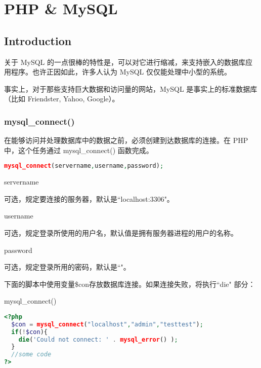 \part{PHP \& MySQL}



\chapter{Introduction}








关于 MySQL 的一点很棒的特性是，可以对它进行缩减，来支持嵌入的数据库应用程序。也许正因如此，许多人认为 MySQL 仅仅能处理中小型的系统。

事实上，对于那些支持巨大数据和访问量的网站，MySQL 是事实上的标准数据库（比如 Friendster, Yahoo, Google）。

\section{mysql\_connect()}


在能够访问并处理数据库中的数据之前，必须创建到达数据库的连接。在 PHP 中，这个任务通过 mysql\_connect() 函数完成。


\begin{lstlisting}[language=PHP]
mysql_connect(servername,username,password);
\end{lstlisting}

\begin{compactitem}
\item servername

可选，规定要连接的服务器，默认是``localhost:3306"。
\item username

可选，规定登录所使用的用户名，默认值是拥有服务器进程的用户的名称。
\item password

可选，规定登录所用的密码，默认是``"。
\end{compactitem}

下面的脚本中使用变量\$con存放数据库连接。如果连接失败，将执行``die" 部分：

\begin{example}
mysql\_connect()
\begin{lstlisting}[language=PHP]
<?php
  $con = mysql_connect("localhost","admin","testtest");
  if(!$con){
    die('Could not connect: ' . mysql_error() );
  }
  //some code
?>
\end{lstlisting}
\end{example}

